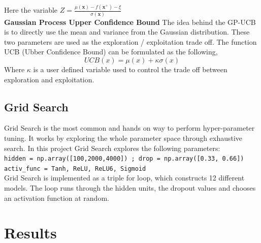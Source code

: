 \documentclass[12pt,fleqn]{article}
\begin{document}
Here the variable $ Z = \frac{\mu(\mathbf{x}) - f(\mathbf{x}^+) - \xi }{\sigma(\mathbf{x})} $ \newline 
\\
\textbf{Gaussian Process Upper Confidence Bound} \newline
The idea behind the GP-UCB is to directly use the mean and variance from the Gaussian distribution. These two parameters are used as the exploration / exploitation trade off. The function UCB (Ubber Confidence Bound) can be formulated as the following, 
\begin{equation*}
UCB(x) = \mu(x) + \kappa \sigma(x)
\end{equation*}
\noindent
Where $ \kappa $ is a user defined variable used to control the trade off between exploration and exploitation. \newline

\subsection*{Grid Search}

Grid Search is the most common and hands on way to perform hyper-parameter tuning. It works by exploring the whole parameter space through exhaustive search. In this project Grid Search explores the following parameters:\\
\texttt{hidden = np.array([100,2000,4000]) ; drop = np.array([0.33, 0.66])\\
activ\_func = {Tanh, ReLU, ReLU6, Sigmoid} } \\
Grid Search is implemented as a triple for loop, which constructs 12 different models. The loop runs through the hidden units, the dropout values and chooses an activation function at random. 

\section{Results}
\end{document}
